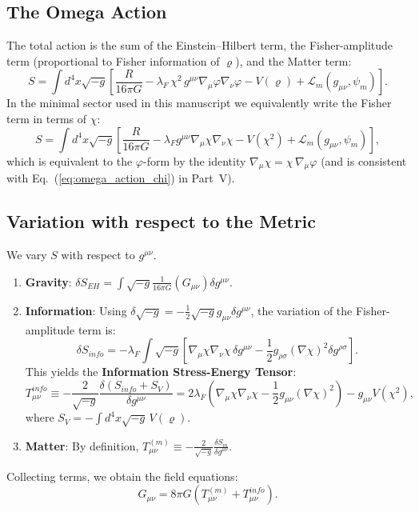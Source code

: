 \subsection{The Omega Action}
The total action is the sum of the Einstein--Hilbert term, the Fisher-amplitude term (proportional to Fisher information of $\varrho$), and the Matter term:
\begin{equation}
    S = \int d^4x \sqrt{-g} \left[ \frac{R}{16\pi G} - \lambda_F\,\chi^2\, g^{\mu\nu} \nabla_\mu \varphi \nabla_\nu \varphi - V(\varrho) + \mathcal{L}_m(g_{\mu\nu}, \psi_m) \right].
\end{equation}
\noindent
In the minimal sector used in this manuscript we equivalently write the Fisher term in terms of $\chi$:
\begin{equation}
    S = \int d^4x \sqrt{-g} \left[ \frac{R}{16\pi G} - \lambda_F g^{\mu\nu} \nabla_\mu \chi \nabla_\nu \chi - V(\chi^2) + \mathcal{L}_m(g_{\mu\nu}, \psi_m) \right],
\label{eq:omega_action_appendix_chi}
\end{equation}
which is equivalent to the $\varphi$-form by the identity $\nabla_\mu\chi=\chi\,\nabla_\mu\varphi$ (and is consistent with Eq.~(\ref{eq:omega_action_chi}) in Part~V).

\subsection{Variation with respect to the Metric}
We vary $S$ with respect to $g^{\mu\nu}$.
\begin{enumerate}
    \item \textbf{Gravity}: $\delta S_{EH} = \int \sqrt{-g} \frac{1}{16\pi G} (G_{\mu\nu}) \delta g^{\mu\nu}$.
    \item \textbf{Information}: Using $\delta \sqrt{-g} = -\frac{1}{2}\sqrt{-g} g_{\mu\nu} \delta g^{\mu\nu}$, the variation of the Fisher-amplitude term is:
    \begin{equation}
        \delta S_{info} = -\lambda_F \int \sqrt{-g} \left[ \nabla_\mu \chi \nabla_\nu \chi \,\delta g^{\mu\nu} - \frac{1}{2} g_{\rho\sigma} (\nabla \chi)^2 \delta g^{\rho\sigma} \right].
    \end{equation}
    This yields the \textbf{Information Stress-Energy Tensor}:
    \begin{equation}
        T_{\mu\nu}^{info} \equiv -\frac{2}{\sqrt{-g}} \frac{\delta (S_{info}+S_V)}{\delta g^{\mu\nu}}
        = 2\lambda_F \left( \nabla_\mu \chi \nabla_\nu \chi - \frac{1}{2} g_{\mu\nu} (\nabla \chi)^2 \right) - g_{\mu\nu} V(\chi^2),
    \end{equation}
    where $S_V = -\int d^4x \sqrt{-g}\, V(\varrho)$.
    \item \textbf{Matter}: By definition, $T_{\mu\nu}^{(m)} \equiv -\frac{2}{\sqrt{-g}} \frac{\delta S_m}{\delta g^{\mu\nu}}$.
\end{enumerate}
Collecting terms, we obtain the field equations:
\begin{equation}
    G_{\mu\nu} = 8\pi G \left( T_{\mu\nu}^{(m)} + T_{\mu\nu}^{info} \right).
\end{equation}

